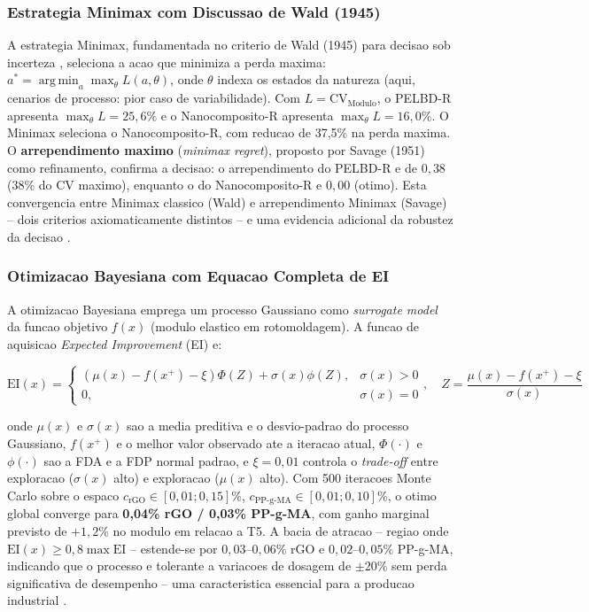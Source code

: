\documentclass[11pt,a4paper,oneside]{article}
\DeclareMathOperator*{\argmin}{arg\,min}
\begin{document}
\subsubsection{Estrategia Minimax com Discussao de Wald (1945)}

A estrategia Minimax, fundamentada no criterio de Wald (1945) para decisao sob incerteza \cite{VonNeumann1928}, seleciona a acao que minimiza a perda maxima: $a^*{=}\argmin_a\max_\theta L(a,\theta)$, onde $\theta$ indexa os estados da natureza (aqui, cenarios de processo: pior caso de variabilidade). Com $L{=}\text{CV}_{\text{Modulo}}$, o PELBD-R apresenta $\max_\theta L{=}25{,}6\%$ e o Nanocomposito-R apresenta $\max_\theta L{=}16{,}0\%$. O Minimax seleciona o Nanocomposito-R, com reducao de 37,5\% na perda maxima. O {\bfseries arrependimento maximo} (\textit{minimax regret}), proposto por Savage (1951) como refinamento, confirma a decisao: o arrependimento do PELBD-R e de $0{,}38$ (38\% do CV maximo), enquanto o do Nanocomposito-R e $0{,}00$ (otimo). Esta convergencia entre Minimax classico (Wald) e arrependimento Minimax (Savage) -- dois criterios axiomaticamente distintos -- e uma evidencia adicional da robustez da decisao \cite{VonNeumann1928, VonNeumann1944}.

\subsubsection{Otimizacao Bayesiana com Equacao Completa de EI}

A otimizacao Bayesiana emprega um processo Gaussiano como \textit{surrogate model} da funcao objetivo $f(x)$ (modulo elastico em rotomoldagem). A funcao de aquisicao \textit{Expected Improvement} (EI) e:

\begin{equation}
\text{EI}(x) = \begin{cases}
(\mu(x) - f(x^+) - \xi)\Phi(Z) + \sigma(x)\phi(Z), & \sigma(x) > 0\\
0, & \sigma(x) = 0
\end{cases},\quad Z = \frac{\mu(x) - f(x^+) - \xi}{\sigma(x)}
\label{eq:ei}
\end{equation}

onde $\mu(x)$ e $\sigma(x)$ sao a media preditiva e o desvio-padrao do processo Gaussiano, $f(x^+)$ e o melhor valor observado ate a iteracao atual, $\Phi(\cdot)$ e $\phi(\cdot)$ sao a FDA e a FDP normal padrao, e $\xi{=}0{,}01$ controla o \textit{trade-off} entre exploracao ($\sigma(x)$ alto) e exploracao ($\mu(x)$ alto). Com 500 iteracoes Monte Carlo sobre o espaco $c_{\text{rGO}}\in[0{,}01;0{,}15]\%$, $c_{\text{PP-g-MA}}\in[0{,}01;0{,}10]\%$, o otimo global converge para {\bfseries 0,04\% rGO / 0,03\% PP-g-MA}, com ganho marginal previsto de $+1{,}2\%$ no modulo em relacao a T5. A bacia de atracao -- regiao onde $\text{EI}(x){\ge}0{,}8\max\text{EI}$ -- estende-se por $0{,}03$--$0{,}06\%$ rGO e $0{,}02$--$0{,}05\%$ PP-g-MA, indicando que o processo e tolerante a variacoes de dosagem de $\pm20\%$ sem perda significativa de desempenho -- uma caracteristica essencial para a producao industrial \cite{Myerson1991}.
\end{document}
